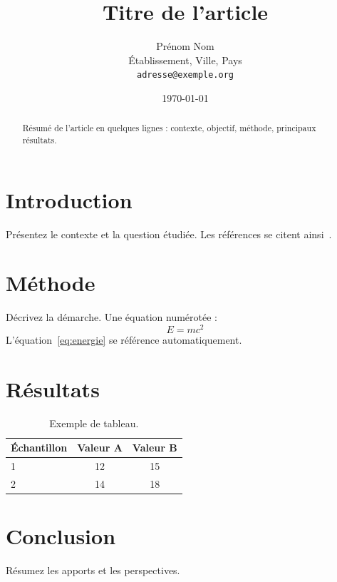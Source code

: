 \documentclass[11pt,a4paper]{article}
\title{Titre de l'article}
\author{Prénom Nom\\ \small Établissement, Ville, Pays\\ \small \texttt{adresse@exemple.org}}
\date{\today}
\begin{document}
\maketitle

\begin{abstract}
Résumé de l'article en quelques lignes : contexte, objectif, méthode, principaux résultats.
\end{abstract}

\section{Introduction}
Présentez le contexte et la question étudiée. Les références se citent ainsi~\cite{knuth1984}.

\section{Méthode}
Décrivez la démarche. Une équation numérotée :
\begin{equation}
  E = mc^2 \label{eq:energie}
\end{equation}
L'équation~\eqref{eq:energie} se référence automatiquement.

\section{Résultats}
\begin{table}[h]
  \centering
  \begin{tabular}{lcc}
    \hline
    Échantillon & Valeur A & Valeur B \\
    \hline
    1 & 12 & 15 \\
    2 & 14 & 18 \\
    \hline
  \end{tabular}
  \caption{Exemple de tableau.}
  \label{tab:resultats}
\end{table}

\section{Conclusion}
Résumez les apports et les perspectives.



\end{document}
